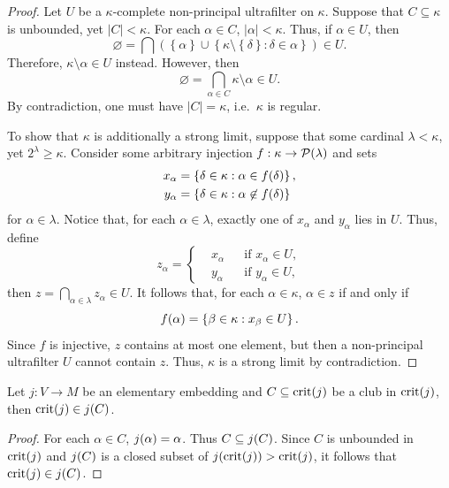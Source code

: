 \documentclass[12pt]{article}
\theoremstyle{plain}
\theoremstyle{definition}
\DeclareMathOperator{\crit}{crit}
\begin{document}
\begin{proof}
	Let $U$ be a $\kappa$-complete non-principal ultrafilter on $\kappa$. Suppose that $C \subseteq \kappa$ is unbounded, yet $\left|C\right| < \kappa$. For each $\alpha \in C$, $\left|\alpha\right| < \kappa$. Thus, if $\alpha \in U$, then
	\[\varnothing = \bigcap \left(\left\{\alpha\right\} \cup \left\{\kappa \setminus \left\{\delta\right\} : \delta \in \alpha\right\}\right) \in U.\]
	Therefore, $\kappa \setminus \alpha \in U$ instead. However, then
	\[\varnothing = \bigcap_{\alpha \in C} \kappa \setminus \alpha \in U.\]
	By contradiction, one must have $\left|C\right| = \kappa$, i.e.\ $\kappa$ is regular.

	To show that $\kappa$ is additionally a strong limit, suppose that some cardinal $\lambda < \kappa$, yet $2^\lambda \geq \kappa$. Consider some arbitrary injection $f : \kappa \rightarrow \mathcal{P}\mleft(\lambda\mright)$ and sets
	\begin{align*}
		x_\alpha & = \left\{\delta \in \kappa : \alpha \in f\mleft(\delta\mright)\right\},    \\
		y_\alpha & = \left\{\delta \in \kappa : \alpha \not\in f\mleft(\delta\mright)\right\}
	\end{align*}
	for $\alpha \in \lambda$. Notice that, for each $\alpha \in \lambda$, exactly one of $x_\alpha$ and $y_\alpha$ lies in $U$. Thus, define
	\[z_\alpha = \left\{\begin{aligned}
			 & x_\alpha &  & \text{if $x_\alpha \in U$}, \\
			 & y_\alpha &  & \text{if $y_\alpha \in U$},
		\end{aligned}\right.\]
	then $z = \bigcap_{\alpha \in \lambda} z_\alpha \in U$. It follows that, for each $\alpha \in \kappa$, $\alpha \in z$ if and only if
	\[f\mleft(\alpha\mright) = \left\{\beta \in \kappa : x_\beta \in U\right\}.\]
	Since $f$ is injective, $z$ contains at most one element, but then a non-principal ultrafilter $U$ cannot contain $z$. Thus, $\kappa$ is a strong limit by contradiction.
\end{proof}

\begin{lemma}
	\label{lem:elementary-embedding-critical-point-in-club}
	Let $j : V \rightarrow M$ be an elementary embedding and $C \subseteq \crit\mleft(j\mright)$ be a club in $\crit\mleft(j\mright)$, then $\crit\mleft(j\mright) \in j\mleft(C\mright)$.
\end{lemma}

\begin{proof}
	For each $\alpha \in C$, $j\mleft(\alpha\mright) = \alpha$. Thus $C \subseteq j\mleft(C\mright)$. Since $C$ is unbounded in $\crit\mleft(j\mright)$ and $j\mleft(C\mright)$ is a closed subset of $j\mleft(\crit\mleft(j\mright)\mright) > \crit\mleft(j\mright)$, it follows that $\crit\mleft(j\mright) \in j\mleft(C\mright)$.
\end{proof}
\end{document}
